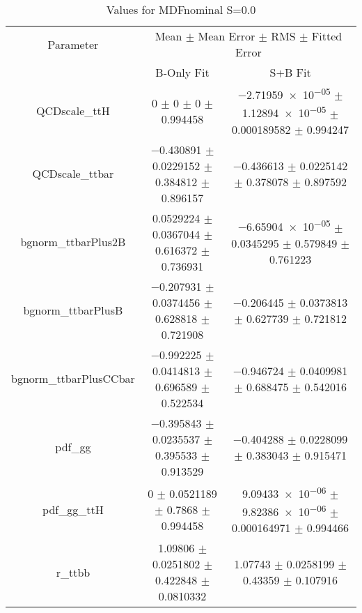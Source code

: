 \begin{table}
\centering
\caption{Values for MDFnominal S=0.0}
\begin{tabular}{ccc}
\toprule
Parameter & \multicolumn{2}{c}{Mean $\pm$ Mean Error $\pm$ RMS $\pm$ Fitted Error}\\
 & B-Only Fit & S+B Fit\\
\midrule
QCDscale\_ttH & \num{0} $\pm$ \num{0} $\pm$ \num{0} $\pm$ \num{0.994458} & \num{-2.71959e-05} $\pm$ \num{1.12894e-05} $\pm$ \num{0.000189582} $\pm$ \num{0.994247}\\
QCDscale\_ttbar & \num{-0.430891} $\pm$ \num{0.0229152} $\pm$ \num{0.384812} $\pm$ \num{0.896157} & \num{-0.436613} $\pm$ \num{0.0225142} $\pm$ \num{0.378078} $\pm$ \num{0.897592}\\
bgnorm\_ttbarPlus2B & \num{0.0529224} $\pm$ \num{0.0367044} $\pm$ \num{0.616372} $\pm$ \num{0.736931} & \num{-6.65904e-05} $\pm$ \num{0.0345295} $\pm$ \num{0.579849} $\pm$ \num{0.761223}\\
bgnorm\_ttbarPlusB & \num{-0.207931} $\pm$ \num{0.0374456} $\pm$ \num{0.628818} $\pm$ \num{0.721908} & \num{-0.206445} $\pm$ \num{0.0373813} $\pm$ \num{0.627739} $\pm$ \num{0.721812}\\
bgnorm\_ttbarPlusCCbar & \num{-0.992225} $\pm$ \num{0.0414813} $\pm$ \num{0.696589} $\pm$ \num{0.522534} & \num{-0.946724} $\pm$ \num{0.0409981} $\pm$ \num{0.688475} $\pm$ \num{0.542016}\\
pdf\_gg & \num{-0.395843} $\pm$ \num{0.0235537} $\pm$ \num{0.395533} $\pm$ \num{0.913529} & \num{-0.404288} $\pm$ \num{0.0228099} $\pm$ \num{0.383043} $\pm$ \num{0.915471}\\
pdf\_gg\_ttH & \num{0} $\pm$ \num{0.0521189} $\pm$ \num{0.7868} $\pm$ \num{0.994458} & \num{9.09433e-06} $\pm$ \num{9.82386e-06} $\pm$ \num{0.000164971} $\pm$ \num{0.994466}\\
r\_ttbb & \num{1.09806} $\pm$ \num{0.0251802} $\pm$ \num{0.422848} $\pm$ \num{0.0810332} & \num{1.07743} $\pm$ \num{0.0258199} $\pm$ \num{0.43359} $\pm$ \num{0.107916}\\
\bottomrule
\end{tabular}
\end{table}